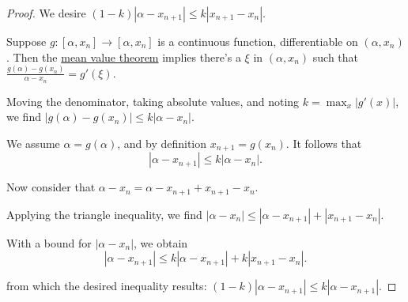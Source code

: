 \documentclass[11pt]{article}
\begin{document}
\begin{proof}
    We desire
\((1-k)\left|\alpha-x_{n+1}\right|\le k\left|x_{n+1}-x_n\right|.\)

Suppose \(g\colon[\alpha, x_n]\to[\alpha,x_n]\) is a continuous
function, differentiable on \((\alpha, x_n)\). Then the
\href{https://calculus.subwiki.org/wiki/Lagrange_mean_value_theorem}{mean
value theorem} implies there's a \(\xi\) in \((\alpha,x_n)\) such that
\(\frac{g(\alpha) - g(x_n)}{\alpha -x_n} = g'(\xi).\)

Moving the denominator, taking absolute values, and noting
\(k = \max_x\left|g'(x)\right|\), we find
\(\left|g(\alpha) - g(x_n)\right| \le k\left|\alpha -x_n\right|.\)

We assume \(\alpha = g(\alpha)\), and by definition
\(x_{n+1} = g(x_n)\). It follows that
\[\left|\alpha - x_{n+1}\right| \le k\left|\alpha -x_n\right|.\]

Now consider that \(\alpha - x_n = \alpha - x_{n+1} + x_{n+1} - x_n.\)

Applying the triangle inequality, we find
\(\left|\alpha - x_n\right| \leq \left|\alpha - x_{n+1}\right| + \left|x_{n+1} - x_n\right|.\)

With a bound for \(\left|\alpha - x_n\right|\), we obtain
\[\left|\alpha - x_{n+1}\right| \leq  k\left|\alpha - x_{n+1}\right| + k\left|x_{n+1} - x_n\right|.\]

from which the desired inequality results:
\((1-k)\left|\alpha - x_{n+1}\right| \leq k\left|\alpha - x_{n+1}\right|.\)
\end{proof}



    
    
    
    
\end{document}
